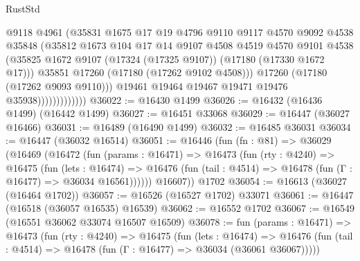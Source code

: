 \begin{lexlean}{RustStd}
\begin{coremodule}
{\begin{coremodule}
{{{{{{{{{{{{{{{{{{{{{{{{{{{{{{{{{{{{{{{{{{{{{{{{{{{{{{{                              @9118
                              @4961
                              (@35831
                                @1675
                                @17
                                @19
                                @4796
                                @9110
                                @9117
                                @4570
                                @9092
                                @4538
                                @35848
                                (@35812
                                  @1673
                                  @104
                                  @17
                                  @14
                                  @9107
                                  @4508
                                  @4519
                                  @4570
                                  @9101
                                  @4538
                                  (@35825
                                    @1672
                                    @9107
                                    (@17324 (@17325 @9107))
                                    (@17180 (@17330 @1672 @17)))
                                  @35851
                                  @17260
                                  (@17180 (@17262 @9102 @4508)))
                                @17260
                                (@17180 (@17262 @9093 @9110)))
                              @19461
                              @19464
                              @19467
                              @19471
                              @19476
                              @35938)))))))))))))
@36022 := @16430 @1499
@36026 := @16432 (@16436 @1499) (@16442 @1499)
@36027 := @16451 @33068
@36029 := @16447 (@36027 @16466)
@36031 := @16489 (@16490 @1499)
@36032 := @16485 @36031
@36034 := @16447 (@36032 @16514)
@36051 := @16446
    (fun (fn : @81) =>
    @36029
      (@16469
        (@16472
          (fun (params : @16471) =>
          @16473
            (fun (rty : @4240) =>
            @16475
              (fun (lets : @16474) =>
              @16476 (fun (tail : @4514) => @16478 (fun (Γ : @16477) => @36034 @16561))))))
        @16607))
    @1702
@36054 := @16613 (@36027 (@16464 @1702))
@36057 := @16526 (@16527 @1702) @33071
@36061 := @16447 (@16518 (@36057 @16535) @16539)
@36062 := @16552 @1702
@36067 := @16549 (@16551 @36062 @33074 @16507 @16509)
@36078 := fun (params : @16471) =>
  @16473
    (fun (rty : @4240) =>
    @16475
      (fun (lets : @16474) =>
      @16476 (fun (tail : @4514) => @16478 (fun (Γ : @16477) => @36034 (@36061 @36067)))))
}}}}}}}}}}}}}}}}}}}}}}}}}}}}}}}}}}}}}}}}}}}}}}}}}}}}}}}
\end{coremodule}}
\end{coremodule}
\end{lexlean}
